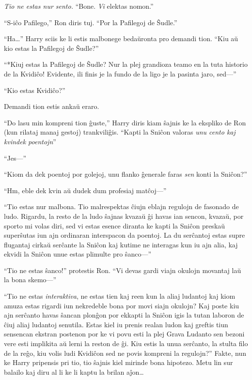 \emph{Tio ne estas nur sento.} ``Bone. \emph{Vi} elektas nomon.''

``S-iĉo Pafilego,'' Ron diris tuj. ``Por la Pafilegoj de Ŝudle.''

``Ha\ldots'' Harry sciis ke li estis malbonege bedaŭronta pro demandi
tion. ``Kiu aŭ kio estas la Pafilegoj de Ŝudle?''

``*Kiuj estas la Pafilegoj de Ŝudle? Nur la plej grandioza teamo en la
tuta historio de la Kvidiĉo! Evidente, ili finis je la fundo de la
ligo je la pasinta jaro, sed—''

``Kio estas Kvidiĉo?''

Demandi tion estis ankaŭ eraro.

``Do lasu min kompreni tion ĝuste,'' Harry diris kiam ŝajnis ke la
ekspliko de Ron (kun rilataj manaj gestoj) trankviliĝis. ``Kapti la
Sniĉon valoras \emph{unu cento kaj kvindek poentojn}''

``Jes—''

``Kiom da dek poentoj por golejoj, unu flanko ĝenerale faras \emph{sen} konti la
Sniĉon?''

``Hm, eble dek kvin aŭ dudek dum profesiaj matĉoj—''

``Tio estas nur malbona. Tio malrespektas ĉiujn eblajn regulojn de
fasonado de ludo. Rigardu, la resto de la ludo ŝajnas kvazaŭ ĝi havas
ian sencon, kvazaŭ, por sporto mi volas diri, sed vi estas esence
diranta ke kapti la Sniĉon preskaŭ superŝutas iun ajn ordinaran
interspacon da poentoj. La du serĉantoj estas supre flugantaj cirkaŭ
serĉante la Sniĉon kaj kutime ne interagas kun iu ajn alia, kaj ekvidi la
Sniĉon unue estas plimulte pro ŝanco—''

``Tio ne estas ŝanco!'' protestis Ron. ``Vi devas gardi viajn okulojn
movantaj laŭ la bona skemo—''

``Tio ne estas \emph{interaktiva}, ne estas tien kaj reen kun la aliaj
ludantoj kaj kiom amuza estas rigardi iun nekredeble bona por
movi siajn okulojn? Kaj poste kiu ajn serĉanto havas ŝancan
plonĝon por ekkapti la Sniĉon igis la tutan laboron de ĉiuj aliaj ludantoj
senutila. Estas kiel iu prenis realan ludon kaj greftis tiun sensencan
ekstran postenon por ke vi povu esti la plej Grava Ludanto sen bezoni
vere esti implikita aŭ lerni la reston de ĝi. Kiu estis la unua
serĉanto, la stulta filo de la reĝo, kiu volis ludi Kvidiĉon sed ne
povis kompreni la regulojn?'' Fakte, nun ke Harry pripensis pri tio,
tio ŝajnis kiel mirinde bona hipotezo. Metu lin sur balailo kaj diru
al li ke li kaptu la brilan aĵon\ldots

